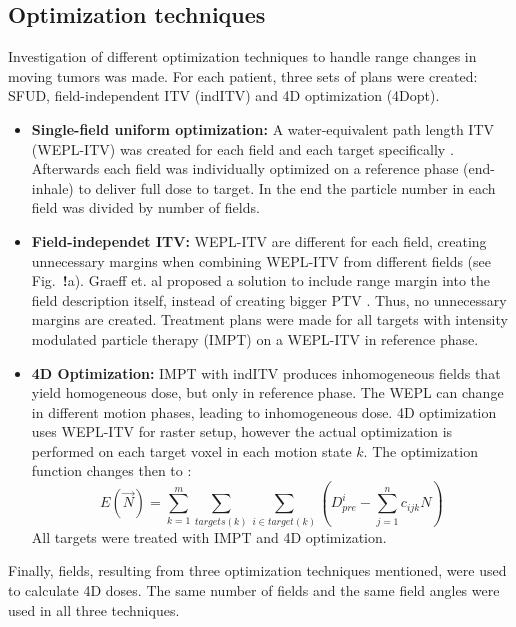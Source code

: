 \documentclass[type=dr, dr=rernat, accentcolor=tud7b,colorbacktitle, bigchapter, openright, twoside, 12pt ]{tudthesis}
\begin{document}
\subsection{Optimization techniques}

Investigation of different optimization techniques to handle range changes in moving tumors was made. For each patient, three sets of plans were created: SFUD, field-independent ITV (indITV) and 4D optimization (4Dopt). 

\begin{itemize}
\item \textbf{Single-field uniform optimization:} A water-equivalent path length ITV (WEPL-ITV) was created for each field and each target specifically \cite{Rietzel2012}. Afterwards each field was individually optimized on a reference phase (end-inhale) to deliver full dose to target. In the end the particle number in each field was divided by number of fields.

\item \textbf{Field-independet ITV:} WEPL-ITV are different for each field, creating unnecessary margins when combining WEPL-ITV from different fields (see Fig.~\textbf{!}a). Graeff et. al proposed a solution to include range margin into the field description itself, instead of creating bigger PTV \cite{Graeff2012}. Thus, no unnecessary margins are created. Treatment plans were made for all targets with intensity modulated particle therapy (IMPT) on a WEPL-ITV in reference phase.

\item \textbf{4D Optimization:} IMPT with indITV produces inhomogeneous fields that yield homogeneous dose, but only in reference phase. The WEPL can change in different motion phases, leading to inhomogeneous dose. 4D optimization uses WEPL-ITV for raster setup, however the actual optimization is performed on each target voxel in each motion state $k$. The optimization function changes then to \cite{Graeff2012}:
\begin{equation}
\label{eq-multiCost}
E(\vec{N}) = \sum_{k=1}^{m}\sum_{targets(k)} \sum_{i\in target(k)} \left( D_{pre}^{i} -\sum_{j=1}^n c_{ijk}N\right)
\end{equation}
All targets were treated with IMPT and 4D optimization. 


\end{itemize}

Finally, fields, resulting from three optimization techniques mentioned, were used to calculate 4D doses. The same number of fields and the same field angles were used in all three techniques.
\end{document}
